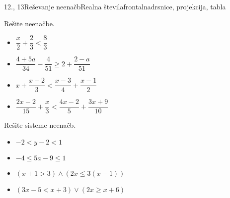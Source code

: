 \begin{priprava}{12., 13}{}{Reševanje neenačb}{Realna števila}{frontalna}{drsnice, projekcija, tabla}
        
        
                
                    \begin{naloga}
                        Rešite neenačbe.
                        \begin{itemize}
                                \item $\dfrac{x}{2}+\dfrac{2}{3}<\dfrac{8}{3}$ 
                                \item $\dfrac{4+5a}{34}-\dfrac{4}{51}\geq 2+\dfrac{2-a}{51}$ 
                                \item $x+\dfrac{x-2}{3}<\dfrac{x-3}{4}+\dfrac{x-1}{2}$ 
                                \item $\dfrac{2x-2}{15}+\dfrac{x}{3}<\dfrac{4x-2}{5}+\dfrac{3x+9}{10}$ 
                        \end{itemize}
                    \end{naloga}
                
        
        
        
                
                    \begin{naloga}
                        Rešite sisteme neenačb.
                        \begin{itemize}
                                \item $-2<y-2<1$ 
                                \item $-4\leq 5a-9\leq 1$ 
                                \item $(x+1>3)\land (2x\leq 3(x-1))$ 
                                \item $(3x-5<x+3)\lor (2x\geq x+6)$ 
                        \end{itemize}
                    \end{naloga}
                
        

    
\end{priprava}